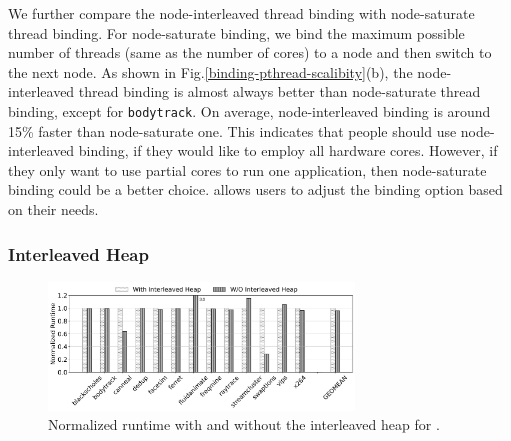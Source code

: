 
We further compare the node-interleaved thread binding with node-saturate thread binding. For node-saturate binding, we bind the maximum possible number of threads (same as the number of cores) to a node and then switch to the next node. As shown in Fig.\ref{binding-pthread-scalibity}(b), the node-interleaved thread binding is almost always better than node-saturate thread binding, except for \texttt{bodytrack}. On average, node-interleaved binding is around 15\% faster than node-saturate one. This indicates that people should use node-interleaved binding, if they would like to employ all hardware cores. However, if they only want to use partial cores to run one application, then node-saturate binding could be a better choice. \NM{} allows users to adjust the binding option based on their needs.


\subsubsection{Interleaved Heap} 
\label{sec:interleavedheap}
\begin{figure}[!ht]
    \centering
    \includegraphics[width=3.2in]{SC2022/figure/interleavedheap.jpg}
    \caption{Normalized runtime with and without the interleaved heap for \NM{}.  \label{fig:interleavedheap}}
\end{figure}


